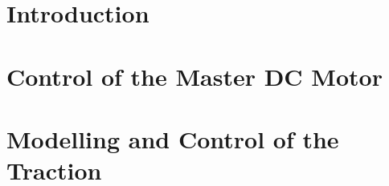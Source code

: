 



\setcounter{page}{2}
\tableofcontents

\hypersetup{allcolors = link}
\chapter{Introduction}


\chapter{Control of the Master DC Motor}
\label{chap:masterDC}


\chapter{Modelling and Control of the Traction}
\label{chap:traction}



